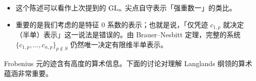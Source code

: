 \begin{itemize}
\begin{itemize}
\item 考虑群代数 $\Lambda:=\overline\Q_\ell[G_{\Q,S}]$，其中 $G_{\Q,S}$ 是 $G_\Q$ 对由 $I_p$（$p\notin S$）生成的子群的闭包所取之商。
\item 设 $W,W'$ 为两个半单连续 $G_{\Q,S}$-表示，且
\[
\Tr(\Frob_p^{\mathrm{arith}}|W)=\Tr(\Frob_p^{\mathrm{arith}}|W')
\]
对一切 $p\notin S$ 成立。
\item 由 Chebotarev 密度定理与连续性，这蕴涵
\[
\Tr(\lambda|W)=\Tr(\lambda|W')
\]
对一切 $\lambda\in\Lambda$ 成立。
\item 对两两不同构的不可约 $\Lambda$-模 $W_1,\dots,W_m$ 与每个 $i=1,\dots,m$，存在 $\mu_i\in\Lambda$，使 $\mu_i=1$ 在 $W_i$ 上、而 $\mu_i=0$ 在 $W_j$ 上（$j\neq i$）（这是中国剩余定理的一个版本）。
\item 把
\[
W=\bigoplus_{i=1}^mW_i^{\oplus n_i},\qquad
W'=\bigoplus_{i=1}^mW_i^{\oplus n'_i}
\]
写成同型分量，其中 $W_1,\dots,W_m$ 不可约、两两不同构，$n_i,n'_i\in\N$（可能为零）。
\item 则
\[
n_i\dim_{\overline\Q_\ell}W_i=\Tr(\mu_i|W)=\Tr(\mu_i|W')=n'_i\dim_{\overline\Q_\ell}W_i
\]
对一切 $i=1,\dots,m$ 成立，即 $n_i=n'_i$，故 $W\cong W'$，如所欲。
\end{itemize}
\item 这个陈述可以看作上次提到的 $\operatorname{GL}_n$ 尖点自守表示「强重数一」的类比。
\item 重要的是我们考虑的是特征 $0$ 系数的表示；也就是说，「仅凭迹 $c_{1,p}$ 就决定（半单）表示」这一说法是错误的。由 Brauer--Nesbitt 定理，完整的系统 $\{c_{1,p},\dots,c_{n,p}\}_{p\notin S}$ 仍然唯一决定有限维半单表示。
\end{itemize}

Frobenius 元的迹含有高度的算术信息。下面的讨论对理解 Langlands 纲领的算术蕴涵非常重要。

